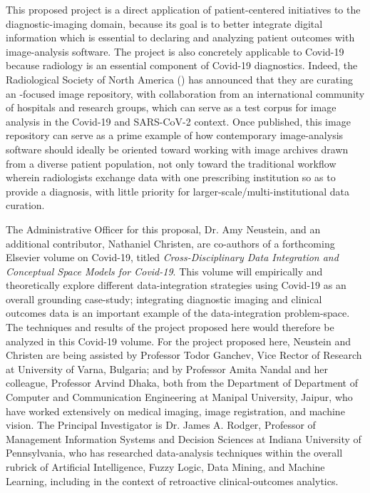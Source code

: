\documentclass[11pt,letterpaper]{article}
\newcommand{\RSNA}{\resizebox{!}{7pt}{\AcronymText{RSNA}}}
\newcommand{\AI}{\resizebox{!}{7.5pt}{\AcronymText{AI}}}
\newcommand{\textscc}[1]{{\color{orr!35!black}{{%
						\fontfamily{Cabin-TLF}\fontseries{b}\selectfont{\textsc{\scriptsize{#1}}}}}}}
\newcommand{\AcronymText}[1]{{\textscc{#1}}}
\newcommand{\p}[1]{

\vspace{1em}#1}
\begin{document}
{\p{This proposed project is a direct application 
of patient-centered initiatives to the 
diagnostic-imaging domain, because its goal is 
to better integrate digital information which 
is essential to declaring and analyzing patient 
outcomes with image-analysis software.  The 
project is also concretely applicable to 
Covid-19 because radiology is an essential 
component of Covid-19 diagnostics.  Indeed, 
the Radiological Society of North America 
(\RSNA{}) has announced that they are curating 
an \AI{}-focused image repository, with collaboration 
from an international community of hospitals 
and research groups, which can serve as a test 
corpus for image analysis in the Covid-19 and 
SARS-CoV-2 context.  Once published, this 
image repository can serve as a prime example 
of how contemporary image-analysis software 
should ideally be oriented toward working 
with image archives drawn from a diverse  
patient population, not only toward the 
traditional workflow wherein radiologists 
exchange data with one prescribing institution 
so as to provide a diagnosis, with little 
priority for larger-scale/multi-institutional 
data curation.}

\p{The Administrative Officer for this proposal, 
Dr. Amy Neustein, and an additional contributor, 
Nathaniel Christen, are co-authors of a 
forthcoming Elsevier volume on Covid-19, 
titled \textit{Cross-Disciplinary Data 
Integration and Conceptual Space Models for Covid-19}.  
This volume will empirically and 
theoretically explore different data-integration 
strategies using Covid-19 as an 
overall grounding case-study; integrating 
diagnostic imaging and clinical outcomes 
data is an important example of the 
data-integration problem-space.  The 
techniques and results of the project proposed 
here would therefore be analyzed 
in this Covid-19 volume.  For the project proposed 
here, Neustein and Christen are being assisted by 
Professor Todor Ganchev, Vice Rector of Research 
at University of Varna, Bulgaria; and by 
Professor Amita Nandal and her colleague, 
Professor Arvind Dhaka, both from 
the Department of Department of Computer and 
Communication Engineering at Manipal University, Jaipur, 
who have worked extensively on medical imaging, image 
registration, and machine 
vision.  The Principal Investigator 
is Dr. James A. Rodger, Professor of Management Information 
Systems and Decision Sciences at Indiana University of 
Pennsylvania, who has researched data-analysis techniques 
within the overall rubrick of Artificial Intelligence, 
Fuzzy Logic, Data Mining, and Machine Learning, 
including in the context of retroactive clinical-outcomes 
analytics.}

}
\end{document}
